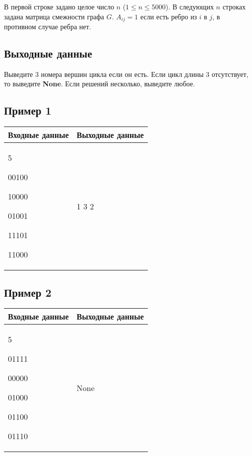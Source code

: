 \documentclass{extarticle}
\begin{document}
В первой строке задано целое число \(n\) (\(1 \leq n \leq 5000\)).
В следующих \(n\) строках задана матрица смежности графа \(G\).
\(A_{ij}=1\) если есть ребро из \(i\) в \(j\), в противном случае ребра нет.

\subsection*{Выходные данные}
\label{sec:org1563044}

Выведите 3 номера вершин цикла если он есть. Если цикл длины 3 отсутствует, то
выведите \textbf{None}.
Если решений несколько, выведите любое.

\subsection*{Пример 1}
\label{sec:orgc69a06d}

\begin{table}[H]
\begin{center}
\begin{tabular}{|m{4cm}|m{4cm}|}
\hline
Входные данные & Выходные данные \\ \hline
5

00100

10000

01001

11101

11000
&
1 3 2
\\ \hline
\end{tabular}
\end{center}
\end{table}

\subsection*{Пример 2}
\label{sec:org6f9ed6a}

\begin{table}[H]
\begin{center}
\begin{tabular}{|m{4cm}|m{4cm}|}
\hline
Входные данные & Выходные данные \\ \hline
5

01111

00000

01000

01100

01110
&
None
\\ \hline
\end{tabular}
\end{center}
\end{table}

\pagebreak
\end{document}
